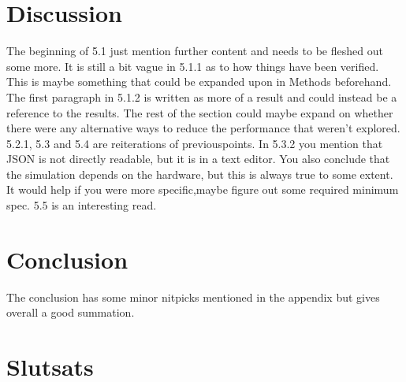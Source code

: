 \documentclass[12pt,a4paper,twoside,openright]{report}
\begin{document}
\section*{Discussion}

The beginning of 5.1 just mention further content and needs to be fleshed out
some more. It is still a bit vague in 5.1.1 as to how things have been
verified. This is maybe something that could be expanded upon in Methods
beforehand. The first paragraph in 5.1.2 is written as more of a result and
could instead be a reference to the results. The rest of the section could
maybe expand on whether there were any alternative ways to reduce the
performance that weren't explored. 5.2.1, 5.3 and 5.4 are reiterations of
previouspoints. In 5.3.2 you mention that JSON is not directly readable, but it 
is in a text editor. You also conclude that the simulation depends on the 
hardware, but this is always true to some extent. It would help if you were 
more specific,maybe figure out some required minimum spec. 5.5 is an 
interesting read.

\section*{Conclusion}

The conclusion has some minor nitpicks mentioned in the appendix but gives
overall a good summation.

\section*{Slutsats}
\end{document}
